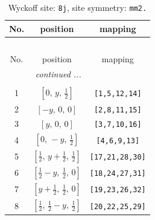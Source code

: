 \documentclass[fleqn,8pt]{jsarticle}
\begin{document}
\begin{longtable}{ccc}
\caption{Wyckoff site: {\tt 8j}, site symmetry: {\tt mm2.}}
 \\
 \hline \hline
No. & position & mapping \\ \hline \endfirsthead

\multicolumn{2}{l}{\tablename\ \thetable{}} \\
 \hline \hline
No. & position & mapping \\ \hline \endhead

 \hline \hline
\multicolumn{2}{r}{\footnotesize\it continued ...} \\ \endfoot

 \hline \hline
\multicolumn{2}{r}{} \\ \endlastfoot

1 & $\left[ 0,\, y,\, \frac{1}{2} \right]$ & {\tt [1,5,12,14]} \\ \hline
2 & $\left[ - y,\, 0,\, 0 \right]$ & {\tt [2,8,11,15]} \\ \hline
3 & $\left[ y,\, 0,\, 0 \right]$ & {\tt [3,7,10,16]} \\ \hline
4 & $\left[ 0,\, - y,\, \frac{1}{2} \right]$ & {\tt [4,6,9,13]} \\ \hline
5 & $\left[ \frac{1}{2},\, y + \frac{1}{2},\, \frac{1}{2} \right]$ & {\tt [17,21,28,30]} \\ \hline
6 & $\left[ \frac{1}{2} - y,\, \frac{1}{2},\, 0 \right]$ & {\tt [18,24,27,31]} \\ \hline
7 & $\left[ y + \frac{1}{2},\, \frac{1}{2},\, 0 \right]$ & {\tt [19,23,26,32]} \\ \hline
8 & $\left[ \frac{1}{2},\, \frac{1}{2} - y,\, \frac{1}{2} \right]$ & {\tt [20,22,25,29]} \\
\end{longtable}
\renewcommand{\arraystretch}{1.2}
\end{document}
